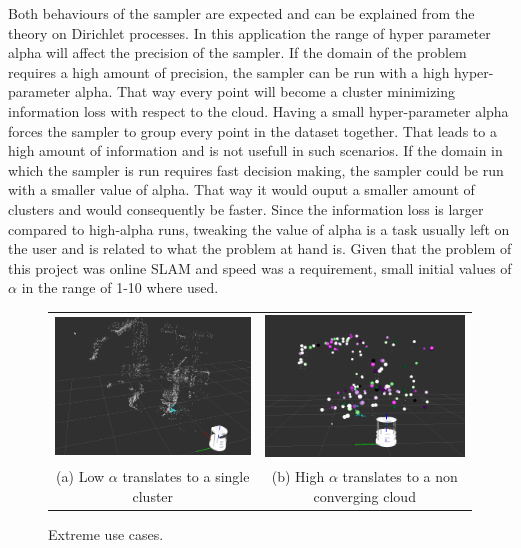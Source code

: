 \documentclass[twoside,hidelinks]{article}
\begin{document}
Both behaviours of the sampler are expected and can be explained from the theory on Dirichlet processes. In this application the range of hyper parameter alpha will affect the precision of the sampler. If the domain of the problem requires a high amount of precision, the sampler can be run with a high hyper-parameter alpha. That way every point will become a cluster minimizing information loss with respect to the cloud. Having a small hyper-parameter alpha forces the sampler to group every point in the dataset together. That leads to a high amount of information and is not usefull in such scenarios. If the domain in which the sampler is run requires fast decision making, the sampler could be run with a smaller value of alpha. That way it would ouput a smaller amount of clusters and would consequently be faster. Since the information loss is larger compared to high-alpha runs, tweaking the value of alpha is a task usually left on the user and is related to  what the problem at hand is. Given that the problem of this project was online SLAM and speed was a requirement, small initial values of $\alpha$ in the range of 1-10 where used. 



\begin{figure}
\begin{tabular}{cc}
    \includegraphics[width=.5\textwidth]{singlecluster} &  \includegraphics[width=.5\textwidth]{onlyclusters2} \\
  (a) Low $\alpha$ translates to a single cluster  & (b) High $\alpha$ translates to a non converging cloud \\[6pt]
\end{tabular}
\caption{Extreme use cases.}
  \label{pip:limits}
\end{figure}
\end{document}
